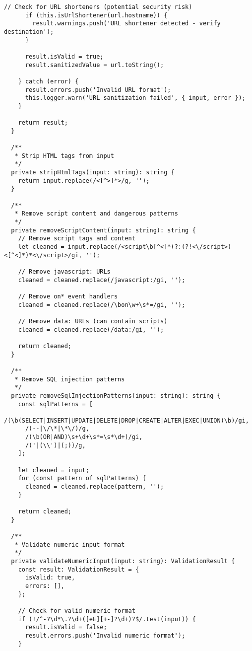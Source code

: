 \documentclass[11pt,a4paper]{article}
\begin{document}
\begin{lstlisting}[style=typescript, caption=Comprehensive Input Sanitization]
      // Check for URL shorteners (potential security risk)
      if (this.isUrlShortener(url.hostname)) {
        result.warnings.push('URL shortener detected - verify destination');
      }

      result.isValid = true;
      result.sanitizedValue = url.toString();

    } catch (error) {
      result.errors.push('Invalid URL format');
      this.logger.warn('URL sanitization failed', { input, error });
    }

    return result;
  }

  /**
   * Strip HTML tags from input
   */
  private stripHtmlTags(input: string): string {
    return input.replace(/<[^>]*>/g, '');
  }

  /**
   * Remove script content and dangerous patterns
   */
  private removeScriptContent(input: string): string {
    // Remove script tags and content
    let cleaned = input.replace(/<script\b[^<]*(?:(?!<\/script>)<[^<]*)*<\/script>/gi, '');
    
    // Remove javascript: URLs
    cleaned = cleaned.replace(/javascript:/gi, '');
    
    // Remove on* event handlers
    cleaned = cleaned.replace(/\bon\w+\s*=/gi, '');
    
    // Remove data: URLs (can contain scripts)
    cleaned = cleaned.replace(/data:/gi, '');
    
    return cleaned;
  }

  /**
   * Remove SQL injection patterns
   */
  private removeSqlInjectionPatterns(input: string): string {
    const sqlPatterns = [
      /(\b(SELECT|INSERT|UPDATE|DELETE|DROP|CREATE|ALTER|EXEC|UNION)\b)/gi,
      /(--|\/\*|\*\/)/g,
      /(\b(OR|AND)\s+\d+\s*=\s*\d+)/gi,
      /('|(\\')|(;))/g,
    ];

    let cleaned = input;
    for (const pattern of sqlPatterns) {
      cleaned = cleaned.replace(pattern, '');
    }

    return cleaned;
  }

  /**
   * Validate numeric input format
   */
  private validateNumericInput(input: string): ValidationResult {
    const result: ValidationResult = {
      isValid: true,
      errors: [],
    };

    // Check for valid numeric format
    if (!/^-?\d*\.?\d+([eE][+-]?\d+)?$/.test(input)) {
      result.isValid = false;
      result.errors.push('Invalid numeric format');
    }


\end{lstlisting}
\end{document}
